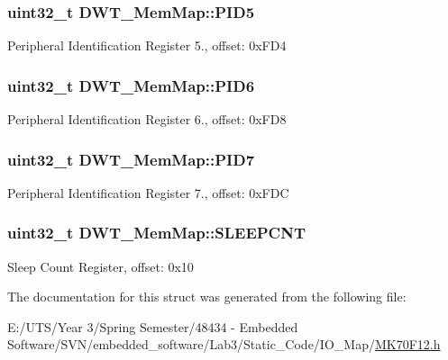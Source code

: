 \subsubsection[{P\+I\+D5}]{\setlength{\rightskip}{0pt plus 5cm}uint32\+\_\+t D\+W\+T\+\_\+\+Mem\+Map\+::\+P\+I\+D5}\label{struct_d_w_t___mem_map_a8b21a1c5290151d5474deb51c391b85b}
Peripheral Identification Register 5., offset\+: 0x\+F\+D4 \hypertarget{struct_d_w_t___mem_map_a7c3faa2d806e506a32d9d3283e3717c2}{}
\subsubsection[{P\+I\+D6}]{\setlength{\rightskip}{0pt plus 5cm}uint32\+\_\+t D\+W\+T\+\_\+\+Mem\+Map\+::\+P\+I\+D6}\label{struct_d_w_t___mem_map_a7c3faa2d806e506a32d9d3283e3717c2}
Peripheral Identification Register 6., offset\+: 0x\+F\+D8 \hypertarget{struct_d_w_t___mem_map_af0158099ec07706eef6138a50643e1c8}{}
\subsubsection[{P\+I\+D7}]{\setlength{\rightskip}{0pt plus 5cm}uint32\+\_\+t D\+W\+T\+\_\+\+Mem\+Map\+::\+P\+I\+D7}\label{struct_d_w_t___mem_map_af0158099ec07706eef6138a50643e1c8}
Peripheral Identification Register 7., offset\+: 0x\+F\+D\+C \hypertarget{struct_d_w_t___mem_map_a0c31354b6fe3f3dd79bc5b768bea4f46}{}
\subsubsection[{S\+L\+E\+E\+P\+C\+N\+T}]{\setlength{\rightskip}{0pt plus 5cm}uint32\+\_\+t D\+W\+T\+\_\+\+Mem\+Map\+::\+S\+L\+E\+E\+P\+C\+N\+T}\label{struct_d_w_t___mem_map_a0c31354b6fe3f3dd79bc5b768bea4f46}
Sleep Count Register, offset\+: 0x10 

The documentation for this struct was generated from the following file\+:\begin{DoxyCompactItemize}
\item 
E\+:/\+U\+T\+S/\+Year 3/\+Spring Semester/48434 -\/ Embedded Software/\+S\+V\+N/embedded\+\_\+software/\+Lab3/\+Static\+\_\+\+Code/\+I\+O\+\_\+\+Map/\hyperlink{_m_k70_f12_8h}{M\+K70\+F12.\+h}\end{DoxyCompactItemize}
